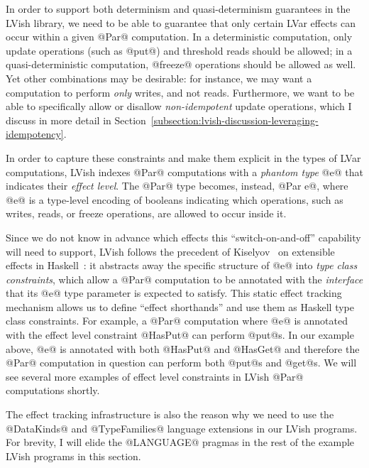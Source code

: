 In order to support both determinism and quasi-determinism guarantees
in the LVish library, we need to be able to guarantee that only
certain LVar effects can occur within a given @Par@ computation.  In a
deterministic computation, only update operations (such as @put@) and
threshold reads should be allowed; in a quasi-deterministic
computation, @freeze@ operations should be allowed as well.  Yet other
combinations may be desirable: for instance, we may want a computation
to perform \emph{only} writes, and not reads.  Furthermore, we want to
be able to specifically allow or disallow \emph{non-idempotent} update
operations, which I discuss in more detail in
Section~\ref{subsection:lvish-discussion-leveraging-idempotency}.

In order to capture these constraints and make them explicit in the
types of LVar computations, LVish indexes @Par@ computations with a
\emph{phantom type} @e@ that indicates their \emph{effect level}.  The
@Par@ type becomes, instead, @Par e@, where @e@ is a type-level
encoding of booleans indicating which operations, such as writes,
reads, or freeze operations, are allowed to occur inside it.


Since we do not know in advance which effects this
``switch-on-and-off'' capability will need to support, LVish follows
the precedent of Kiselyov \etal~on extensible effects in
Haskell~\cite{oleg-amr-haskell-2013}: it abstracts away the specific
structure of @e@ into \emph{type class constraints}, which allow a
@Par@ computation to be annotated with the \emph{interface} that its
@e@ type parameter is expected to satisfy.  This static effect
tracking mechanism allows us to define ``effect shorthands'' and use
them as Haskell type class constraints.  For example, a @Par@
computation where @e@ is annotated with the effect level constraint
@HasPut@ can perform @put@s.  In our example above, @e@ is annotated
with both @HasPut@ and @HasGet@ and therefore the @Par@ computation in
question can perform both @put@s and @get@s.  We will see several more
examples of effect level constraints in LVish @Par@ computations
shortly.

The effect tracking infrastructure is also the reason why we need to
use the @DataKinds@ and @TypeFamilies@ language extensions in our
LVish programs.  For brevity, I will elide the @LANGUAGE@ pragmas in
the rest of the example LVish programs in this section.  

